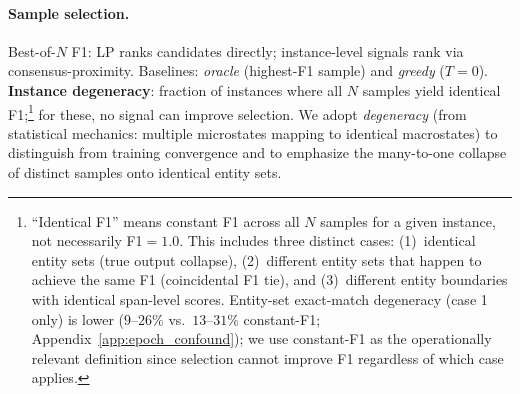 \paragraph{Sample selection.}
Best-of-$N$ F1: LP ranks candidates directly; instance-level signals rank via consensus-proximity.
Baselines: \textit{oracle} (highest-F1 sample) and \textit{greedy} ($T{=}0$).
\textbf{Instance degeneracy}: fraction of instances where all $N$ samples yield identical F1;\footnote{``Identical F1'' means constant F1 across all $N$ samples for a given instance, not necessarily F1${=}1.0$. This includes three distinct cases: (1)~identical entity sets (true output collapse), (2)~different entity sets that happen to achieve the same F1 (coincidental F1 tie), and (3)~different entity boundaries with identical span-level scores. Entity-set exact-match degeneracy (case 1 only) is lower ($9$--$26$\% vs.\ $13$--$31$\% constant-F1; Appendix~\ref{app:epoch_confound}); we use constant-F1 as the operationally relevant definition since selection cannot improve F1 regardless of which case applies.} for these, no signal can improve selection.
We adopt \textit{degeneracy} (from statistical mechanics: multiple microstates mapping to identical macrostates) to distinguish from training convergence and to emphasize the many-to-one collapse of distinct samples onto identical entity sets.
